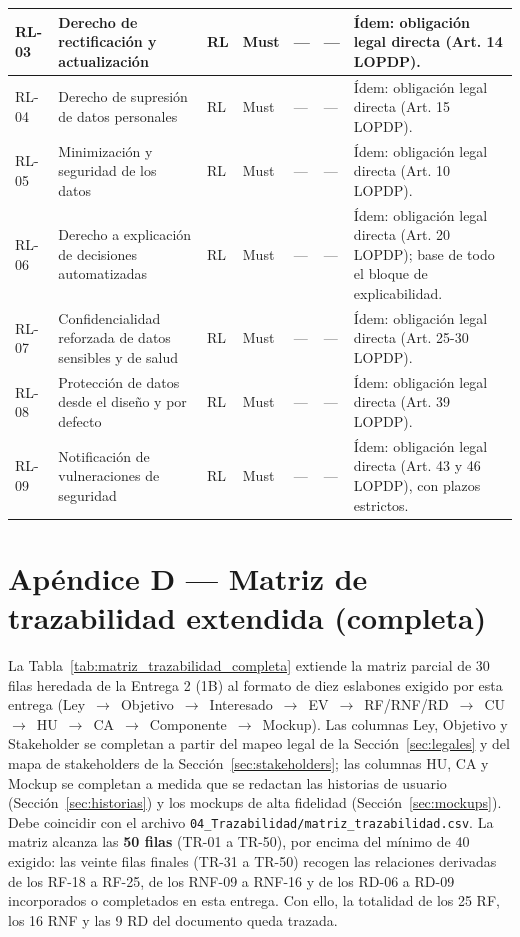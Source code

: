 \documentclass[journal,onecolumn]{IEEEtran}
\begin{document}
\begin{landscape}
\begin{longtable}{@{}p{1.2cm} p{5.2cm} p{1.0cm} p{1.3cm} p{1.3cm} p{1.1cm} p{6.5cm}@{}}
			RL-03 & Derecho de rectificación y actualización & RL & Must & --- & --- & Ídem: obligación legal directa (Art. 14 LOPDP). \\ \midrule
			RL-04 & Derecho de supresión de datos personales & RL & Must & --- & --- & Ídem: obligación legal directa (Art. 15 LOPDP). \\ \midrule
			RL-05 & Minimización y seguridad de los datos & RL & Must & --- & --- & Ídem: obligación legal directa (Art. 10 LOPDP). \\ \midrule
			RL-06 & Derecho a explicación de decisiones automatizadas & RL & Must & --- & --- & Ídem: obligación legal directa (Art. 20 LOPDP); base de todo el bloque de explicabilidad. \\ \midrule
			RL-07 & Confidencialidad reforzada de datos sensibles y de salud & RL & Must & --- & --- & Ídem: obligación legal directa (Art. 25-30 LOPDP). \\ \midrule
			RL-08 & Protección de datos desde el diseño y por defecto & RL & Must & --- & --- & Ídem: obligación legal directa (Art. 39 LOPDP). \\ \midrule
			RL-09 & Notificación de vulneraciones de seguridad & RL & Must & --- & --- & Ídem: obligación legal directa (Art. 43 y 46 LOPDP), con plazos estrictos. \\
		\end{longtable}
	\end{landscape}
	
	\section*{Apéndice D --- Matriz de trazabilidad extendida (completa)}
	\label{ap:trazabilidad}
	
	La Tabla~\ref{tab:matriz_trazabilidad_completa} extiende la matriz parcial de
	30 filas heredada de la Entrega 2 (1B) al formato de diez eslabones exigido
	por esta entrega (Ley~$\rightarrow$~Objetivo~$\rightarrow$~Interesado~$\rightarrow$~EV~$\rightarrow$~RF/RNF/RD~$\rightarrow$~CU~$\rightarrow$~HU~$\rightarrow$~CA~$\rightarrow$~Componente~$\rightarrow$~Mockup).
	Las columnas Ley, Objetivo y Stakeholder se completan a partir del mapeo legal
	de la Sección~\ref{sec:legales} y del mapa de stakeholders de la
	Sección~\ref{sec:stakeholders}; las columnas HU, CA y Mockup se completan a
	medida que se redactan las historias de usuario (Sección~\ref{sec:historias})
	y los mockups de alta fidelidad (Sección~\ref{sec:mockups}). Debe coincidir
	con el archivo \texttt{04\_Trazabilidad/matriz\_trazabilidad.csv}. La matriz
	alcanza las \textbf{50 filas} (TR-01 a TR-50), por encima del mínimo de 40
	exigido: las veinte filas finales (TR-31 a TR-50) recogen las relaciones
	derivadas de los RF-18 a RF-25, de los RNF-09 a RNF-16 y de los RD-06 a RD-09
	incorporados o completados en esta entrega. Con ello, la totalidad de los 25
	RF, los 16 RNF y las 9 RD del documento queda trazada.
	
\end{document}
